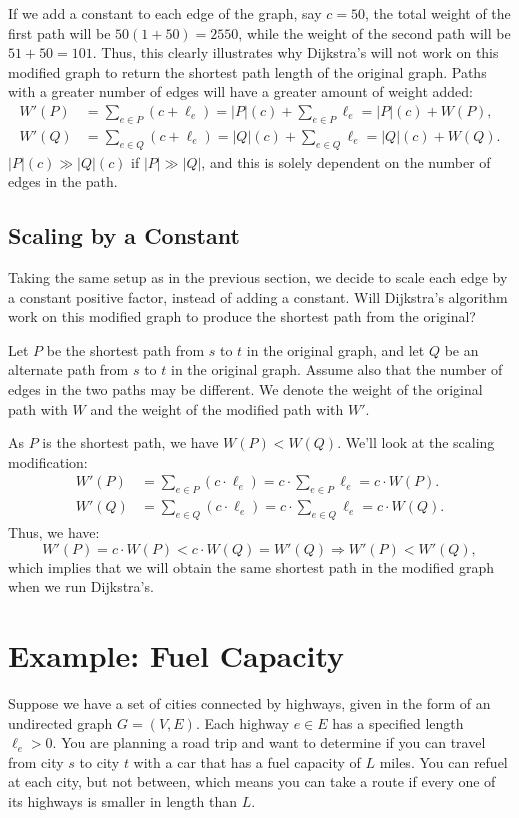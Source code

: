 \documentclass[11pt]{article}
\begin{document}
If we add a constant to each edge of the graph, say $c = 50$, the total weight of the first path will be $50(1 + 50) = 2550$, while the weight of the second path will be $51 + 50 = 101$. Thus, this clearly illustrates why Dijkstra's will not work on this modified graph to return the shortest path length of the original graph. Paths with a greater number of edges will have a greater amount of weight added:
\begin{align*}
    W'(P) &= \sum_{e \in P} (c + \ell_e) = |P|(c) + \sum_{e \in P} \ell_e = |P|(c) + W(P), \\
    W'(Q) &= \sum_{e \in Q} (c + \ell_e) = |Q|(c) + \sum_{e \in Q} \ell_e = |Q|(c) + W(Q). 
\end{align*}
$|P|(c) \gg |Q|(c)$ if $|P| \gg |Q|$, and this is solely dependent on the number of edges in the path. 

\subsection{Scaling by a Constant}
Taking the same setup as in the previous section, we decide to scale each edge by a constant positive factor, instead of adding a constant. Will Dijkstra's algorithm work on this modified graph to produce the shortest path from the original?

Let $P$ be the shortest path from $s$ to $t$ in the original graph, and let $Q$ be an alternate path from $s$ to $t$ in the original graph. Assume also that the number of edges in the two paths may be different. We denote the weight of the original path with $W$ and the weight of the modified path with $W'$. 

As $P$ is the shortest path, we have $W(P) < W(Q)$. We'll look at the scaling modification:
\begin{align*}
    W'(P) &= \sum_{e \in P} (c \cdot \ell_e) = c \cdot \sum_{e \in P} \ell_e = c \cdot W(P). \\
    W'(Q) &= \sum_{e \in Q} (c \cdot \ell_e) = c \cdot \sum_{e \in Q} \ell_e = c \cdot W(Q). 
\end{align*}
Thus, we have:
\begin{equation*}
    W'(P) = c \cdot W(P) < c \cdot W(Q) = W'(Q) \Longrightarrow W'(P) < W'(Q),
\end{equation*}
which implies that we will obtain the same shortest path in the modified graph when we run Dijkstra's. 

\section{Example: Fuel Capacity}
Suppose we have a set of cities connected by highways, given in the form of an undirected graph $G = (V, E)$. Each highway $e \in E$ has a specified length $\ell_e > 0$. You are planning a road trip and want to determine if you can travel from city $s$ to city $t$ with a car that has a fuel capacity of $L$ miles. You can refuel at each city, but not between, which means you can take a route if every one of its highways is smaller in length than $L$. 
\end{document}
